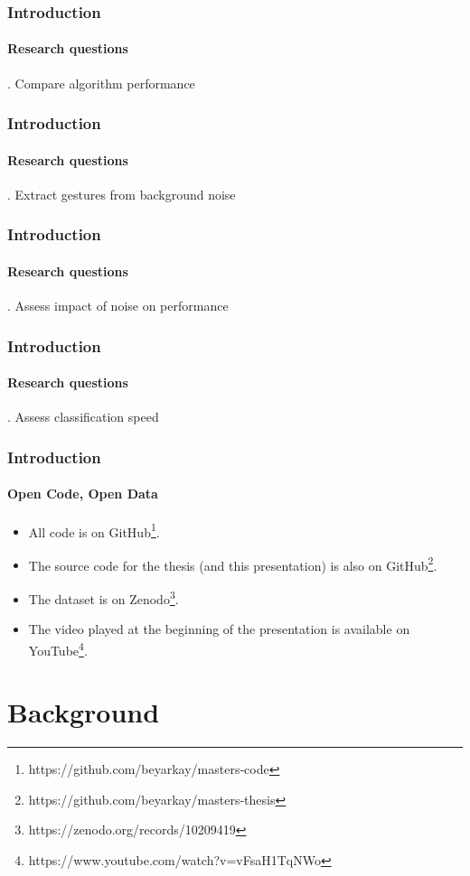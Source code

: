 \documentclass[xcolor={svgnames,table},10pt,fleqn]{beamer}
\begin{document}
\begin{frame}
    \frametitle{Introduction}
    \framesubtitle{Research questions}
    . Compare algorithm performance
\end{frame}

\begin{frame}
    \frametitle{Introduction}
    \framesubtitle{Research questions}
    . Extract gestures from background noise
\end{frame}

\begin{frame}
    \frametitle{Introduction}
    \framesubtitle{Research questions}
    . Assess impact of noise on performance
\end{frame}

\begin{frame}
    \frametitle{Introduction}
    \framesubtitle{Research questions}
    . Assess classification speed
\end{frame}

\begin{frame}
    \frametitle{Introduction}
    \framesubtitle{Open Code, Open Data}
    \begin{itemize}
        \item All code is on
            GitHub\footnote{https://github.com/beyarkay/masters‐code}.
        \item The source code for the thesis (and this presentation) is also on
            GitHub\footnote{https://github.com/beyarkay/masters‐thesis}.
        \item The dataset is on
            Zenodo\footnote{https://zenodo.org/records/10209419}.
        \item The video played at the beginning of the presentation is
            available on
            YouTube\footnote{https://www.youtube.com/watch?v=vFsaH1TqNWo}.
    \end{itemize}
\end{frame}

\section{Background}
\end{document}
